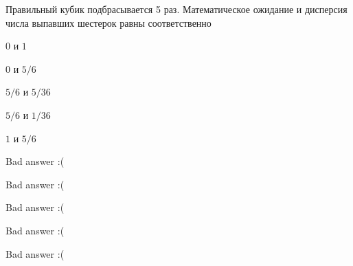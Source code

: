
\begin{question}
Правильный кубик подбрасывается 5 раз. Математическое ожидание и
дисперсия числа выпавших шестерок равны соответственно
\begin{answerlist}
  \item \(0\) и \(1\)
  \item \(0\) и \(5/6\)
  \item \(5/6\) и \(5/36\)
  \item \(5/6\) и \(1/36\)
  \item \(1\) и \(5/6\)
\end{answerlist}
\end{question}

\begin{solution}
\begin{answerlist}
  \item Bad answer :(
  \item Bad answer :(
  \item Bad answer :(
  \item Bad answer :(
  \item Bad answer :(
\end{answerlist}
\end{solution}

